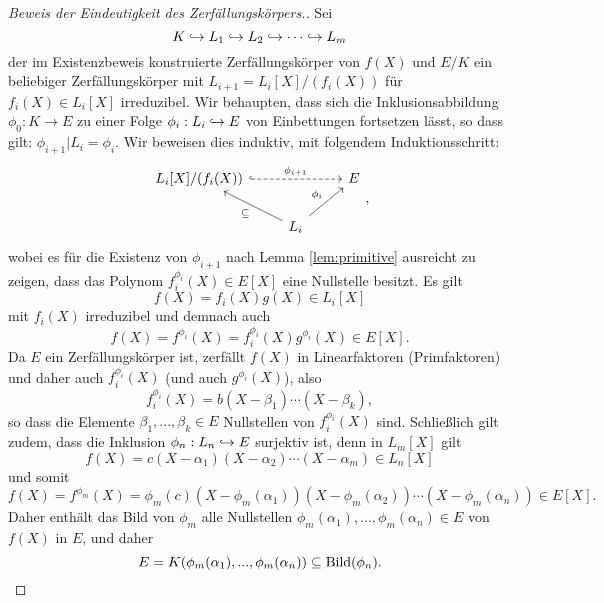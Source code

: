 \documentclass{book}
\begin{document}
\begin{proof}[Beweis der Eindeutigkeit des Zerfällungskörpers.]
    Sei 
    \[
        K \hookrightarrow L_1 \hookrightarrow L_2 \hookrightarrow \cdots \hookrightarrow L_m
    \]
    der im Existenzbeweis konstruierte Zerfällungskörper von $f(X)$ und $E/K$
    ein beliebiger Zerfällungskörper mit $L_{i+1} = L_i[X]/(f_i(X))$ für
    $f_i(X) \in L_i[X]$ irreduzibel. Wir behaupten, dass sich die
    Inklusionsabbildung $\phi_0: K \to E$ zu einer Folge $\phi_i: L_i \hra E$
    von Einbettungen fortsetzen lässt, so dass gilt: $\phi_{i+1}|L_i = \phi_i$.
    Wir beweisen dies induktiv, mit folgendem Induktionsschritt: 
    \[
        \begin{tikzcd}
            L_i[X]/(f_i(X)) \ar[hook, dashed]{rr}{\phi_{i+1}} & &E\\
            & L_i\ar{ul}{\subset} \ar{ur}{\phi_i} & 
        \end{tikzcd},
    \]
    wobei es für die Existenz von $\phi_{i+1}$ nach Lemma \ref{lem:primitive}
    ausreicht zu zeigen, dass das Polynom $f_i^{\phi_i}(X) \in E[X]$ eine
    Nullstelle besitzt. Es gilt
    \[
        f(X) = f_i(X) g(X) \in L_i[X]
    \]
    mit $f_i(X)$ irreduzibel und demnach auch 
    \[
        f(X) = f^{\phi_i}(X) = f_i^{\phi_i}(X) g^{\phi_i}(X) \in E[X].
    \]
    Da $E$ ein Zerfällungskörper ist, zerfällt $f(X)$ in Linearfaktoren
    (Primfaktoren) und daher auch $f_i^{\phi_i}(X)$ (und auch $g^{\phi_i}(X)$), also
    \[
        f_i^{\phi_i}(X) = b (X-\beta_1) \cdots (X - \beta_k),
    \]
    so dass die Elemente $\beta_1, ..., \beta_k \in E$ Nullstellen von
    $f_i^{\phi_i}(X)$ sind.  Schließlich gilt zudem, dass die Inklusion
    $\phi_n: L_n \hra E$ surjektiv ist, denn in $L_m[X]$ gilt
    \[
        f(X) = c (X - \alpha_1) (X-\alpha_2) \cdots (X-\alpha_m)  \in L_n[X]
    \]
    und somit 
    \[
        f(X) = f^{\phi_m}(X) = \phi_m(c) (X - \phi_m(\alpha_1)) (X- \phi_m(\alpha_2)) \cdots (X- \phi_m(\alpha_n)) \in E[X].
    \]
    Daher enthält das Bild von $\phi_m$ alle Nullstellen $\phi_m(\alpha_1), ..., \phi_m(\alpha_n) \in E$ von $f(X)$ in $E$, und daher 
    \[
        E = K(\phi_m(\alpha_1), ..., \phi_m(\alpha_n)) \subset \Bild(\phi_n). 
    \]
\end{proof}
\end{document}
